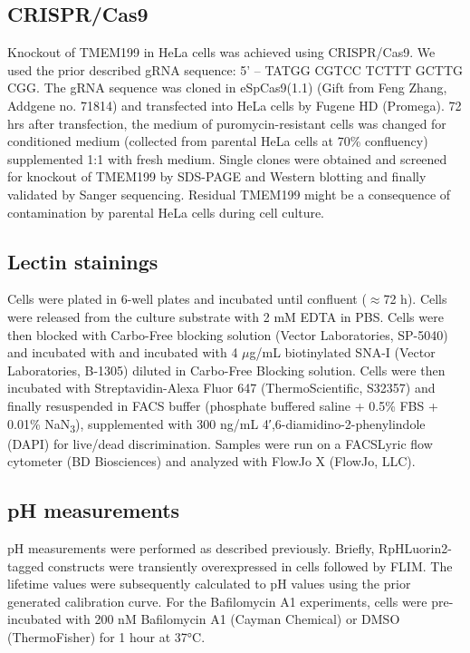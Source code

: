 \subsection{CRISPR/Cas9}

Knockout of TMEM199 in HeLa cells was achieved using CRISPR/Cas9. We used the prior described gRNA sequence: 5’ – TATGG CGTCC TCTTT GCTTG CGG\cite{miles_vacuolar-atpase_2017}. The gRNA sequence was cloned in eSpCas9(1.1) (Gift from Feng Zhang, Addgene no. 71814)\cite{slaymaker_rationally_2016} and transfected into HeLa cells by Fugene HD (Promega). 72 hrs after transfection, the medium of puromycin-resistant cells was changed for conditioned medium (collected from parental HeLa cells at 70\% confluency) supplemented 1:1 with fresh medium. Single clones were obtained and screened for knockout of TMEM199 by SDS-PAGE and Western blotting and finally validated by Sanger sequencing. Residual TMEM199 might be a consequence of contamination by parental HeLa cells during cell culture.

\subsection{Lectin stainings}
Cells were plated in 6-well plates and incubated until confluent ($\approx$72 h). Cells were released from the culture substrate with 2 mM EDTA in PBS. Cells were then blocked with Carbo-Free blocking solution (Vector Laboratories, SP-5040) and incubated with and incubated with 4 $\mu$g/mL biotinylated SNA-I (Vector Laboratories, B-1305) diluted in Carbo-Free Blocking solution. Cells were then incubated with Streptavidin-Alexa Fluor 647 (ThermoScientific, S32357) and finally resuspended in FACS buffer (phosphate buffered saline + 0.5\% FBS + 0.01\% NaN\textsubscript{3}), supplemented with 300 ng/mL 4′,6-diamidino-2-phenylindole (DAPI) for live/dead discrimination. Samples were run on a FACSLyric flow cytometer (BD Biosciences) and analyzed with FlowJo X (FlowJo, LLC).

\subsection{pH measurements}

pH measurements were performed as described previously\cite{linders_fluorescence_2021}. Briefly, RpHLuorin2-tagged constructs were transiently overexpressed in cells followed by FLIM. The lifetime values were subsequently calculated to pH values using the prior generated calibration curve\cite{linders_fluorescence_2021}. For the Bafilomycin A1 experiments, cells were pre-incubated with 200 nM Bafilomycin A1 (Cayman Chemical) or DMSO (ThermoFisher) for 1 hour at 37°C.

